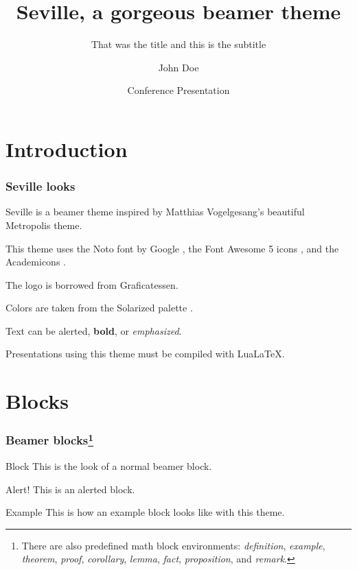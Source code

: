 \documentclass{beamer}
\title{Seville, a gorgeous beamer theme}
\subtitle{That was the title and this is the subtitle}
\author{John Doe}
\date{Conference Presentation \the\year{}}
\institute{University of \LaTeX}
\begin{document}
\begin{frame}

    \titlepage

\end{frame}

\section{Introduction}

\begin{frame}
    \frametitle{Seville looks}

    Seville is a beamer theme inspired by Matthias Vogelgesang's beautiful Metropolis theme.

    This theme uses the Noto font by Google \faGoogle, the Font Awesome 5 icons \faFontAwesome, and the Academicons \aiAcademiaSquare.

    The logo is borrowed from Graficatessen.

    Colors are taken from the Solarized palette \faPalette.

    Text can be \alert{alerted}, \textbf{bold}, or \emph{emphasized}.

    Presentations using this theme must be compiled with Lua\LaTeX.

\end{frame}

\section{Blocks}

\begin{frame}
    \frametitle{Beamer blocks\footnote{There are also predefined math block environments: \emph{definition}, \emph{example}, \emph{theorem}, \emph{proof}, \emph{corollary}, \emph{lemma}, \emph{fact}, \emph{proposition}, and \emph{remark}.}}

    \begin{block}{Block}
        This is the look of a normal beamer block.
    \end{block}

    \begin{alertblock}{Alert!}
        This is an alerted block.
    \end{alertblock}

    \begin{exampleblock}{Example}
        This is how an example block looks like with this theme.
    \end{exampleblock}

\end{frame}
\end{document}
